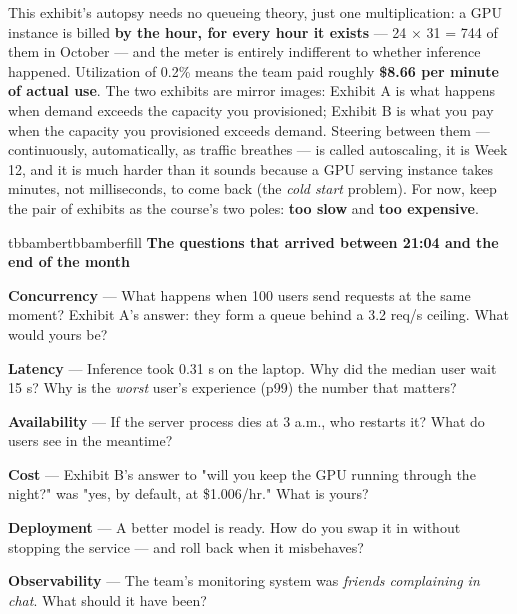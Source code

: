 This exhibit's autopsy needs no queueing theory, just one multiplication: a GPU instance is billed \textbf{by the hour, for every hour it exists} — 24 × 31 = 744 of them in October — and the meter is entirely indifferent to whether inference happened. Utilization of 0.2\% means the team paid roughly \textbf{\$8.66 per minute of actual use}. The two exhibits are mirror images: Exhibit A is what happens when demand exceeds the capacity you provisioned; Exhibit B is what you pay when the capacity you provisioned exceeds demand. Steering between them — continuously, automatically, as traffic breathes — is called autoscaling, it is Week 12, and it is much harder than it sounds because a GPU serving instance takes minutes, not milliseconds, to come back (the \textit{cold start} problem). For now, keep the pair of exhibits as the course's two poles: \textbf{too slow} and \textbf{too expensive}.

\begin{calloutbox}{tbbamber}{tbbamberfill}
{\normalsize\bfseries\color{tbbamberdark}The questions that arrived between 21:04 and the end of the month}\par\vspace{3pt}
\begin{tbbitemize}
  \item \textbf{Concurrency} — What happens when 100 users send requests at the same moment? Exhibit A's answer: they form a queue behind a 3.2 req/s ceiling. What would yours be?
  \item \textbf{Latency} — Inference took 0.31 s on the laptop. Why did the median user wait 15 s? Why is the \textit{worst} user's experience (p99) the number that matters?
  \item \textbf{Availability} — If the server process dies at 3 a.m., who restarts it? What do users see in the meantime?
  \item \textbf{Cost} — Exhibit B's answer to "will you keep the GPU running through the night?" was "yes, by default, at \$1.006/hr." What is yours?
  \item \textbf{Deployment} — A better model is ready. How do you swap it in without stopping the service — and roll back when it misbehaves?
  \item \textbf{Observability} — The team's monitoring system was \textit{friends complaining in chat}. What should it have been?
\end{tbbitemize}
\end{calloutbox}

\vspace{3.0pt}

